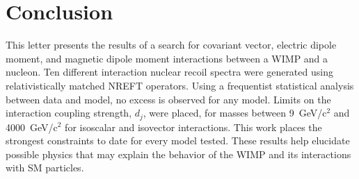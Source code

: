 \documentclass[reprint, showpacs,
preprintnumbers,
amsmath,amssymb,
aps, floatfix,
superscriptaddress,
prd, nofootinbib]{revtex4-1}
\begin{document}
\section{\label{sec:conclusion}Conclusion}
This letter presents the results of a search for covariant vector, electric dipole moment, and magnetic dipole moment interactions between a WIMP and a nucleon.
Ten different interaction nuclear recoil spectra were generated using relativistically matched NREFT operators.
Using a frequentist statistical analysis between data and model, no excess is observed for any model. 
Limits on the interaction coupling strength, $d_j$, were placed, for masses between 9~GeV/c$^2$ and 4000~GeV/c$^2$ for isoscalar and isovector interactions. 
This work places the strongest constraints to date for every model tested. 
These results help elucidate possible physics that may explain the behavior of the WIMP and its interactions with SM particles.
\end{document}
